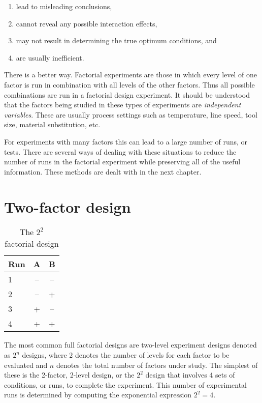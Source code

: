 \begin{enumerate}
\item lead to misleading conclusions,
\item cannot reveal any possible interaction effects,
\item may not result in determining the true optimum conditions, and
\item are usually inefficient.
\end{enumerate}

There is a better way.  Factorial experiments are those in which every level of one factor is run in combination with all levels of the other factors.  Thus all possible combinations are run in a factorial design experiment. It should be understood that the factors being studied in these types of experiments are \textit{independent variables}.  These are usually process settings such as temperature, line speed, tool size, material substitution, etc.  

For experiments with many factors this can lead to a large number of runs, or tests.  There are several ways of dealing with these situations to reduce the number of runs in the factorial experiment while preserving all of the useful information. These methods are dealt with in the next chapter.

\section{Two-factor design}
\begin{table}[h] \caption{The $ 2^{2} $ factorial design }\label{tab1}
\begin{center}
\begin{tabular}{|l|c|c|}
\hline Run & A & B \\ 
\hline 1 & -- & -- \\ 
\hline 2 & -- & \cellcolor{black!25}+ \\ 
\hline 3 & \cellcolor{black!25}+ & -- \\ 
\hline 4 & \cellcolor{black!25}+ & \cellcolor{black!25}+ \\ 
\hline 
\end{tabular} 
\end{center}
\end{table}
The most common full factorial designs are two-level experiment designs denoted as $ 2^{n} $ designs, where $2$ denotes the number of levels for each factor to be evaluated and $n$ denotes the total number of factors under study.  The simplest of these is the 2-factor, 2-level design, or the $ 2^{2} $ design that involves 4 sets of conditions, or runs, to complete the experiment.  This number of experimental runs is determined by computing the exponential expression $ 2^{2} = 4 $.

